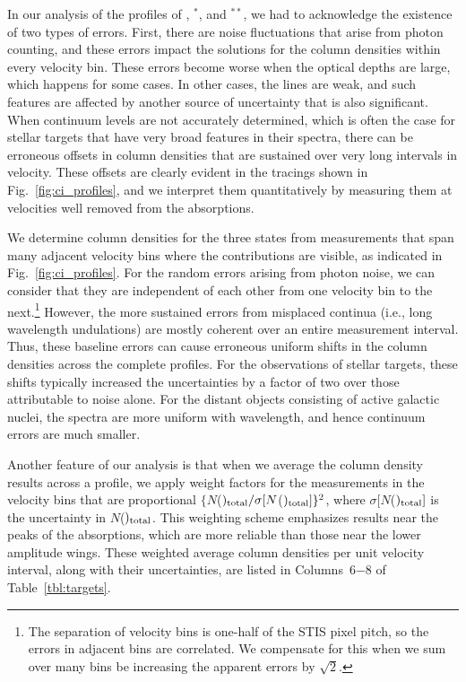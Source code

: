 \documentclass[modern]{aastex63}
\begin{document}
In our analysis of the profiles of , $^*$, and $^{**}$, we had to 
acknowledge the existence of two types of errors.  First, there are noise fluctuations that arise 
from photon counting, and these errors impact the solutions for the column densities within 
every velocity bin.  These errors become worse when the optical depths are large, which 
happens for some cases.  In other cases, the lines are weak, and such features are affected by 
another source of uncertainty that is also significant.  When continuum levels are not accurately 
determined, which is often the case for stellar targets that have very broad features in their 
spectra, there can be erroneous offsets in column densities that are sustained over very long 
intervals in velocity.  These offsets are clearly evident in the tracings shown in 
Fig.~\ref{fig:ci_profiles}, and we interpret them quantitatively by measuring them at velocities 
well removed from the  absorptions.

We determine column densities for the three  states from measurements that span 
many adjacent velocity bins where the contributions are visible, as indicated in 
Fig.~\ref{fig:ci_profiles}.  For the random errors arising from photon noise, we can consider that 
they are independent of each other from one velocity bin to the next.\footnote{The separation 
of velocity bins is one-half of the STIS pixel pitch, so the errors in adjacent bins are correlated.  
We compensate for this when we sum over many bins be increasing the apparent errors by 
$\sqrt{2}$.}  However, the more sustained errors from misplaced continua (i.e., long 
wavelength undulations) are mostly coherent over an entire measurement interval.  Thus, 
these baseline errors can cause erroneous uniform shifts in the column densities across the 
complete profiles.  For the observations of stellar targets, these shifts typically increased the 
uncertainties by a factor of two over those attributable to noise alone.  For the distant objects 
consisting of active galactic nuclei, the spectra are more uniform with wavelength, and hence 
continuum errors are much smaller.

Another feature of our analysis is that when we average the column density results across a 
profile, we apply weight factors for the measurements in the velocity bins that are proportional 
$\{N$($)_{\rm total}/\sigma[N$($)_{\rm total}]\}^2$, where 
$\sigma[N$($)_{\rm total}]$ is the uncertainty in $N$($)_{\rm total}$.  This 
weighting scheme emphasizes results near the peaks of the absorptions, which are more 
reliable than those near the lower amplitude wings.  These weighted average column densities 
per unit velocity interval, along with their uncertainties, are listed in Columns~6$-$8 of 
Table~\ref{tbl:targets}.
\end{document}
